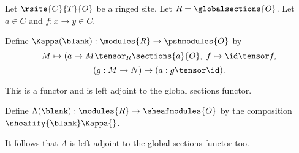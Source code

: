 Let $\rsite{C}{T}{O}$ be a ringed site.
Let $R=\globalsections{O}$. Let $a\in C$ and $f:x\rightarrow y \in C$.

Define $\Kappa(\blank): \modules{R} \rightarrow \pshmodules{O}$ by
\[M \mapsto (a \mapsto M \tensor_R \sections{a}{O} ,\; f \mapsto \id \tensor f ,\]
\[(g: M \rightarrow N) \mapsto (a: g \tensor \id )  .\]

This is a functor and is left adjoint to the global sections functor.

Define $\Lambda(\blank):\modules{R} \rightarrow \sheafmodules{O}$ by the composition
$\sheafify{\blank} \Kappa{}$.

It follows that $\Lambda$ is left adjoint to the global sections functor too.
